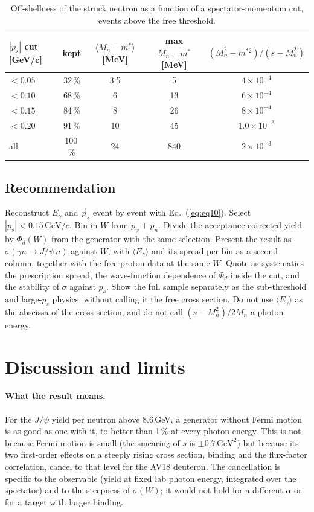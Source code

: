 \documentclass[11pt,a4paper]{article}
\newcommand{\Eg}{E_\gamma}
\newcommand{\jpsi}{J/\psi}
\newcommand{\GeV}{\,\mathrm{GeV}}
\begin{document}
\begin{table}[htbp]
\centering
\caption{Off-shellness of the struck neutron as a function of a spectator-momentum cut, events
above the free threshold.}
\label{tab:offshell}
\begin{tabular}{lcccc}
\toprule
$|p_s|$ cut [GeV/c] & kept & $\langle M_n-m^*\rangle$ [MeV] & max $M_n-m^*$ [MeV] & $(M_n^2-m^{*2})/(s-M_n^2)$ \\
\midrule
$<0.05$ & 32\,\% & 3.5 & 5 & $4\times10^{-4}$ \\
$<0.10$ & 68\,\% & 6 & 13 & $6\times10^{-4}$ \\
$<0.15$ & 84\,\% & 8 & 26 & $8\times10^{-4}$ \\
$<0.20$ & 91\,\% & 10 & 45 & $1.0\times10^{-3}$ \\
all & 100\,\% & 24 & 840 & $2\times10^{-3}$ \\
\bottomrule
\end{tabular}
\end{table}

\subsection{Recommendation}

Reconstruct $\Eg$ and $\vec p_s$ event by event with Eq.~(\ref{eq:eq10}).  Select
$|p_s|<0.15\GeV/c$.  Bin in $W$ from $p_\psi+p_n$.  Divide the acceptance-corrected yield by
$\Phi_d(W)$ from the generator with the same selection.  Present the result as
$\sigma(\gamma n\to\jpsi\,n)$ against $W$, with $\langle\Eg\rangle$ and its spread per bin as a
second column, together with the free-proton data at the same $W$.  Quote as systematics the
prescription spread, the wave-function dependence of $\Phi_d$ inside the cut, and the stability
of $\sigma$ against $p_s$.  Show the full sample separately as the sub-threshold and large-$p_s$
physics, without calling it the free cross section.  Do not use $\langle\Eg\rangle$ as the
abscissa of the cross section, and do not call $(s-M_n^2)/2M_n$ a photon energy.

\section{Discussion and limits}
\label{sec:discussion}

\paragraph{What the result means.}  For the $\jpsi$ yield per neutron above 8.6\,GeV, a generator
without Fermi motion is as good as one with it, to better than 1\,\% at every photon energy.
This is not because Fermi motion is small (the smearing of $s$ is $\pm0.7\GeV^2$) but because its
two first-order effects on a steeply rising cross section, binding and the flux-factor correlation,
cancel to that level for the AV18 deuteron.  The cancellation is specific to the observable (yield at
fixed lab photon energy, integrated over the spectator) and to the steepness of $\sigma(W)$; it would
not hold for a different $\alpha$ or for a target with larger binding.
\end{document}
